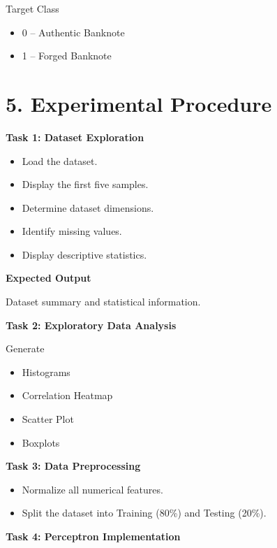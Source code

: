 \documentclass{article}
\begin{document}
Target Class

\begin{itemize}
\item 0 -- Authentic Banknote
\item 1 -- Forged Banknote
\end{itemize}


\section*{5. Experimental Procedure}

\textbf{Task 1: Dataset Exploration}

\begin{itemize}
\item Load the dataset.
\item Display the first five samples.
\item Determine dataset dimensions.
\item Identify missing values.
\item Display descriptive statistics.
\end{itemize}

\textbf{Expected Output}

Dataset summary and statistical information.

\vspace{2mm}

\textbf{Task 2: Exploratory Data Analysis}

Generate

\begin{itemize}
\item Histograms
\item Correlation Heatmap
\item Scatter Plot
\item Boxplots
\end{itemize}

\textbf{Task 3: Data Preprocessing}

\begin{itemize}
\item Normalize all numerical features.
\item Split the dataset into Training (80\%) and Testing (20\%).
\end{itemize}

\vspace{2mm}

\textbf{Task 4: Perceptron Implementation}
\end{document}
